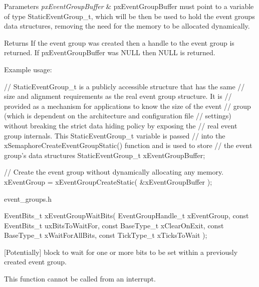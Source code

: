 \begin{DoxyParams}{Parameters}
{\em px\+Event\+Group\+Buffer} & px\+Event\+Group\+Buffer must point to a variable of type Static\+Event\+Group\+\_\+t, which will be then be used to hold the event group\textquotesingle{}s data structures, removing the need for the memory to be allocated dynamically.\\
\hline
\end{DoxyParams}
\begin{DoxyReturn}{Returns}
If the event group was created then a handle to the event group is returned. If px\+Event\+Group\+Buffer was N\+U\+LL then N\+U\+LL is returned.
\end{DoxyReturn}
Example usage\+: 
\begin{DoxyPre}
 // StaticEventGroup\_t is a publicly accessible structure that has the same
 // size and alignment requirements as the real event group structure.  It is
 // provided as a mechanism for applications to know the size of the event
 // group (which is dependent on the architecture and configuration file
 // settings) without breaking the strict data hiding policy by exposing the
 // real event group internals.  This StaticEventGroup\_t variable is passed
 // into the xSemaphoreCreateEventGroupStatic() function and is used to store
 // the event group's data structures
 StaticEventGroup\_t xEventGroupBuffer;\end{DoxyPre}



\begin{DoxyPre} // Create the event group without dynamically allocating any memory.
 xEventGroup = xEventGroupCreateStatic( &xEventGroupBuffer );
\end{DoxyPre}
 event\+\_\+groups.\+h 
\begin{DoxyPre}
   EventBits\_t xEventGroupWaitBits(    EventGroupHandle\_t xEventGroup,
                                       const EventBits\_t uxBitsToWaitFor,
                                       const BaseType\_t xClearOnExit,
                                       const BaseType\_t xWaitForAllBits,
                                       const TickType\_t xTicksToWait );
  \end{DoxyPre}


\mbox{[}Potentially\mbox{]} block to wait for one or more bits to be set within a previously created event group.

This function cannot be called from an interrupt.


